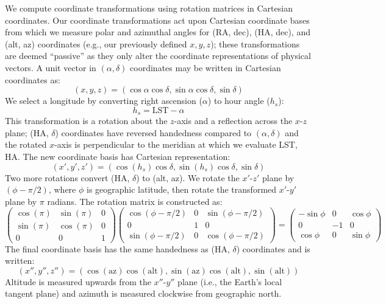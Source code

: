 \documentclass[10pt]{article}
\begin{document}
We compute coordinate transformations using rotation matrices in Cartesian coordinates.
Our coordinate transformations act upon Cartesian coordinate bases from which we measure polar and azimuthal angles for (RA, dec), (HA, dec), and (alt, az) coordinates (e.g., our previously defined $x,y,z$); these transformations are deemed ``passive'' as they only alter the coordinate representations of physical vectors.
A unit vector in $(\alpha, \delta)$ coordinates may be written in Cartesian coordinates as:
\[
	(x, y, z) = (\cos\alpha\cos\delta, \sin\alpha\cos\delta, \sin\delta)
\]
We select a longitude by converting right ascension ($\alpha$) to hour angle ($h_s$):
\[
	h_s = \mathrm{LST} - \alpha
\]
This transformation is a rotation about the $z$-axis and a reflection across the $x$-$z$ plane; (HA, $\delta$) coordinates have reversed handedness compared to $(\alpha, \delta)$ and the rotated $x$-axis is perpendicular to the meridian at which we evaluate LST, HA.
The new coordinate basis has Cartesian representation:
\[
	(x', y', z') = (\cos(h_s)\cos\delta, \sin(h_s)\cos\delta, \sin\delta)
\]
Two more rotations convert (HA, $\delta$) to (alt, az).
We rotate the $x'$-$z'$ plane by $(\phi - \pi /2)$, where $\phi$ is geographic latitude, then rotate the transformed $x'$-$y'$ plane by $\pi$ radians.
The rotation matrix is constructed as:
\[
	\begin{pmatrix}
		\cos(\pi) & \sin(\pi) & 0 \\
		\sin(\pi) & \cos(\pi) & 0 \\
		0 & 0 & 1
	\end{pmatrix}
	\begin{pmatrix}
		\cos\left(\phi-\pi/2\right) & 0 & \sin\left(\phi-\pi/2\right) \\
		0 & 1 & 0 \\
		\sin\left(\phi-\pi/2\right) & 0 & \cos\left(\phi-\pi/2\right)
	\end{pmatrix}
	=
	\begin{pmatrix}
		-\sin\phi & 0 & \cos\phi \\
		0 & -1 & 0 \\
		\cos\phi & 0 & \sin\phi
	\end{pmatrix}
\]
The final coordinate basis has the same handedness as (HA, $\delta$) coordinates and is written:
\[
	(x'', y'', z'') = (\cos(\mathrm{az})\cos(\mathrm{alt}),
					   \sin(\mathrm{az})\cos(\mathrm{alt}),
					   \sin(\mathrm{alt}))
\]
Altitude is measured upwards from the $x''$-$y''$ plane (i.e., the Earth's local tangent plane) and azimuth is measured clockwise from geographic north.
\end{document}
